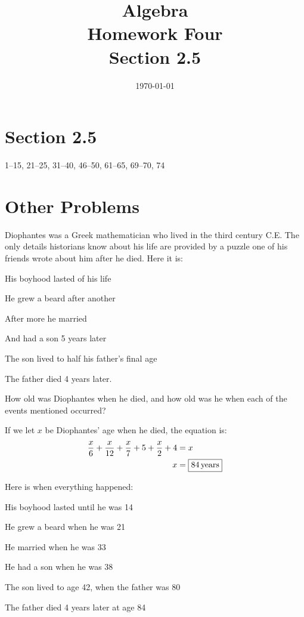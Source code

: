 \documentclass[letterpaper, landscape]{exam}
\title{Algebra \\ Homework Four \\ Section 2.5}
\author{}
\date{\today}
\begin{document}
  \maketitle

  \section{Section 2.5}
  1--15, 21--25, 31--40, 46--50, 61--65, 69--70, 74

  \section{Other Problems}

  Diophantes was a Greek mathematician who lived in the third century C.E.  The only details
  historians know about his life are provided by a puzzle one of his friends wrote about him after
  he died.  Here it is:

  \begin{itemize*}
    \item His boyhood lasted  of his life
    \item He grew a beard after another 
    \item After  more he married
    \item And had a son 5 years later
    \item The son lived to half his father's final age
    \item The father died 4 years later.
  \end{itemize*}

  How old was Diophantes when he died, and how old was he when each of the events mentioned occurred?

  \begin{solution}
    If we let $x$ be Diophantes' age when he died, the equation is:
    \begin{align*}
      \frac{x}{6} + \frac{x}{12} + \frac{x}{7} + 5 + \frac{x}{2} + 4 & = x \\
      x                                                              & = \boxed{ \unit[84]{years} } \\
    \end{align*}

    Here is when everything happened:
    \begin{itemize*}
      \item His boyhood lasted until he was 14
      \item He grew a beard when he was 21 
      \item He married when he was 33
      \item He had a son when he was 38
      \item The son lived to age 42, when the father was 80
      \item The father died 4 years later at age 84
    \end{itemize*}

  \end{solution}
\end{document}
